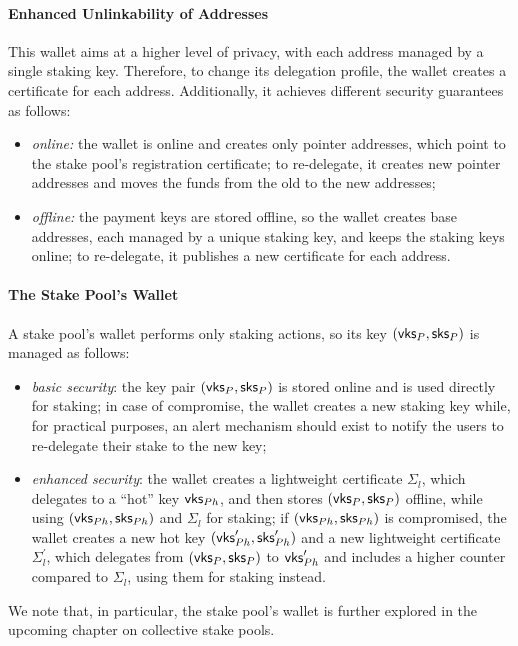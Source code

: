 \paragraph{Enhanced Unlinkability of Addresses}
This wallet aims at a higher level of privacy, with each address managed by a
single staking key. Therefore, to change its delegation profile, the wallet
creates a certificate for each address. Additionally, it achieves different
security guarantees as follows:
\begin{itemize}
    \item \emph{online:} the wallet is online and creates only pointer
        addresses, which point to the stake pool's registration certificate; to
        re-delegate, it creates new pointer addresses and moves the funds from
        the old to the new addresses;
    \item \emph{offline:} the payment keys are stored offline, so the wallet
        creates base addresses, each managed by a unique staking key, and keeps
        the staking keys online; to re-delegate, it publishes a new certificate
        for each address.
\end{itemize}

\paragraph{The Stake Pool's Wallet}
A stake pool's wallet performs only staking actions, so its key
$(\mathsf{vks}_P, \mathsf{sks}_P)$ is managed as follows:
\begin{itemize}
    \item \emph{basic security}: the key pair $(\mathsf{vks}_P, \mathsf{sks}_P)$
        is stored online and is used directly for staking; in case of
        compromise, the wallet creates a new staking key while, for practical
        purposes, an alert mechanism should exist to notify the users to
        re-delegate their stake to the new key;
    \item \emph{enhanced security}: the wallet creates a lightweight
        certificate $\Sigma_l$, which delegates to a ``hot'' key
        $\mathsf{vks}_{Ph}$, and then stores $(\mathsf{vks}_P,
        \mathsf{sks}_P)$ offline, while using $(\mathsf{vks}_{Ph}, \mathsf{sks}_{Ph})$ and
        $\Sigma_l$ for staking; if $(\mathsf{vks}_{Ph}, \mathsf{sks}_{Ph})$ is compromised, the
        wallet creates a new hot key $(\mathsf{vks}_{Ph}^\prime, \mathsf{sks}_{Ph}^\prime)$ and a new
        lightweight certificate $\Sigma_l^\prime$, which delegates from
        $(\mathsf{vks}_{P}, \mathsf{sks}_{P})$ to $\mathsf{vks}_{Ph}^\prime$ and includes a
        higher counter compared to $\Sigma_l$, using them for staking instead.
\end{itemize}
We note that, in particular, the stake pool's wallet is further explored in the
upcoming chapter on collective stake pools.

